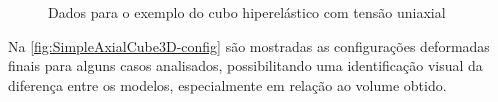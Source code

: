 \documentclass[Tese.tex]{subfiles}
\begin{document}
\begin{figure}[!h]
	\centering
	\caption{Dados para o exemplo do cubo hiperelástico com tensão uniaxial}
	\label{fig:SimpleAxialCube3D}
	{\small
		\noindent{}
	}	
\end{figure}

Na \autoref{fig:SimpleAxialCube3D-config} são mostradas as configurações deformadas finais para alguns casos analisados, possibilitando uma identificação visual da diferença entre os modelos, especialmente em relação ao volume obtido. 
\end{document}
